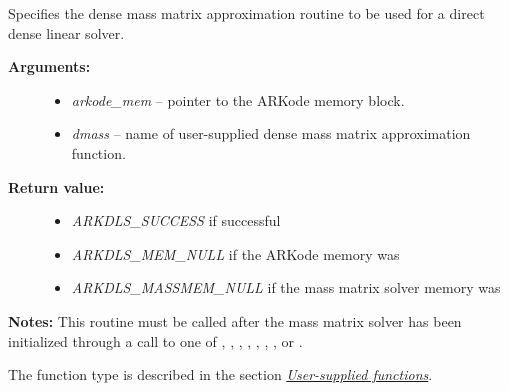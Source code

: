 \documentclass[letterpaper,10pt,english]{sphinxmanual}
\begin{document}
\begin{fulllineitems}
\label{c_interface/User_callable:ARKDlsSetDenseMassFn}
Specifies the dense mass matrix approximation routine to
be used for a direct dense linear solver.
\begin{description}
\item[{\textbf{Arguments:}}] \leavevmode\begin{itemize}
\item {} 
\emph{arkode\_mem} -- pointer to the ARKode memory block.

\item {} 
\emph{dmass} -- name of user-supplied dense mass matrix approximation function.

\end{itemize}

\item[{\textbf{Return value:}}] \leavevmode\begin{itemize}
\item {} 
\emph{ARKDLS\_SUCCESS}  if successful

\item {} 
\emph{ARKDLS\_MEM\_NULL}  if the ARKode memory was 

\item {} 
\emph{ARKDLS\_MASSMEM\_NULL} if the mass matrix solver memory was 

\end{itemize}

\end{description}

\textbf{Notes:} This routine must be called after the mass matrix solver
has been initialized through a call to one of
{\hyperref[c_interface/User_callable:ARKMassDense]{}}, {\hyperref[c_interface/User_callable:ARKMassLapackDense]{}},
{\hyperref[c_interface/User_callable:ARKMassBand]{}}, {\hyperref[c_interface/User_callable:ARKMassLapackBand]{}},
{\hyperref[c_interface/User_callable:ARKMassSpgmr]{}}, {\hyperref[c_interface/User_callable:ARKMassSpbcg]{}},
{\hyperref[c_interface/User_callable:ARKMassSptfqmr]{}}, {\hyperref[c_interface/User_callable:ARKMassSpfgmr]{}} or
{\hyperref[c_interface/User_callable:ARKMassPcg]{}}.

The function type {\hyperref[c_interface/User_supplied:ARKDlsDenseMassFn]{}} is described in the section
{\hyperref[c_interface/User_supplied:cinterface-usersupplied]{\emph{User-supplied functions}}}.

\end{fulllineitems}
\end{document}
